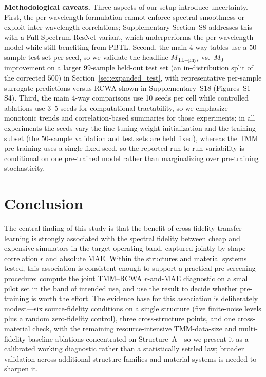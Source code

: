 \documentclass[a4paper,fleqn]{cas-sc}
\newcommand{\Mzero}{M_0}
\newcommand{\Mtlphys}{M_\text{TL+phys}}
\begin{document}
\textbf{Methodological caveats.} Three aspects of our setup introduce uncertainty. First, the per-wavelength formulation cannot enforce spectral smoothness or exploit inter-wavelength correlations; Supplementary Section~S8 addresses this with a Full-Spectrum ResNet variant, which underperforms the per-wavelength model while still benefiting from PBTL. Second, the main 4-way tables use a $50$-sample test set per seed, so we validate the headline $\Mtlphys$ vs.\ $\Mzero$ improvement on a larger $99$-sample held-out test set (an in-distribution split of the corrected $500$) in Section~\ref{sec:expanded_test}, with representative per-sample surrogate predictions versus RCWA shown in Supplementary~S18 (Figures~S1--S4). Third, the main 4-way comparisons use 10 seeds per cell while controlled ablations use 3--5 seeds for computational tractability, so we emphasize monotonic trends and correlation-based summaries for those experiments; in all experiments the seeds vary the fine-tuning weight initialization and the training subset (the $50$-sample validation and test sets are held fixed), whereas the TMM pre-training uses a single fixed seed, so the reported run-to-run variability is conditional on one pre-trained model rather than marginalizing over pre-training stochasticity.


\section{Conclusion}
\label{sec:conclusion}

The central finding of this study is that the benefit of cross-fidelity transfer learning is strongly associated with the spectral fidelity between cheap and expensive simulators in the target operating band, captured jointly by shape correlation $r$ and absolute MAE. Within the structures and material systems tested, this association is consistent enough to support a practical pre-screening procedure: compute the joint TMM--RCWA $r$-and-MAE diagnostic on a small pilot set in the band of intended use, and use the result to decide whether pre-training is worth the effort. The evidence base for this association is deliberately modest---six source-fidelity conditions on a single structure (five finite-noise levels plus a random zero-fidelity control), three cross-structure points, and one cross-material check, with the remaining resource-intensive TMM-data-size and multi-fidelity-baseline ablations concentrated on Structure~A---so we present it as a calibrated working diagnostic rather than a statistically settled law; broader validation across additional structure families and material systems is needed to sharpen it.
\end{document}
